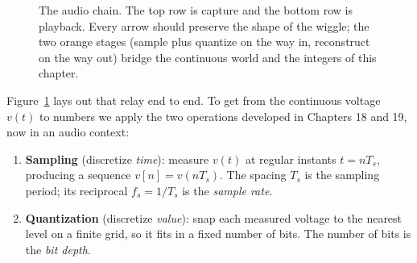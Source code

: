 \begin{figure}[H]
\centering
{}
\caption{The audio chain. The top row is capture and the bottom row is playback. Every arrow should preserve the shape of the wiggle; the two orange stages (sample plus quantize on the way in, reconstruct on the
way out) bridge the continuous world and the integers of this chapter.}
\label{ch26:fig-chain}
\end{figure}

Figure~\ref{ch26:fig-chain} lays out that relay end to end. To get from the continuous voltage
$v(t)$ to numbers we apply the two operations developed in Chapters 18 and 19, now in an audio
context:

\begin{enumerate}
\item \textbf{Sampling} (discretize \emph{time}): measure $v(t)$ at regular instants
  $t = nT_s$, producing a sequence $v[n] = v(nT_s)$. The spacing $T_s$ is the sampling period;
  its reciprocal $f_s = 1/T_s$ is the \emph{sample rate}.
\item \textbf{Quantization} (discretize \emph{value}): snap each measured voltage to the nearest
  level on a finite grid, so it fits in a fixed number of bits. The number of bits is the
  \emph{bit depth}.
\end{enumerate}

